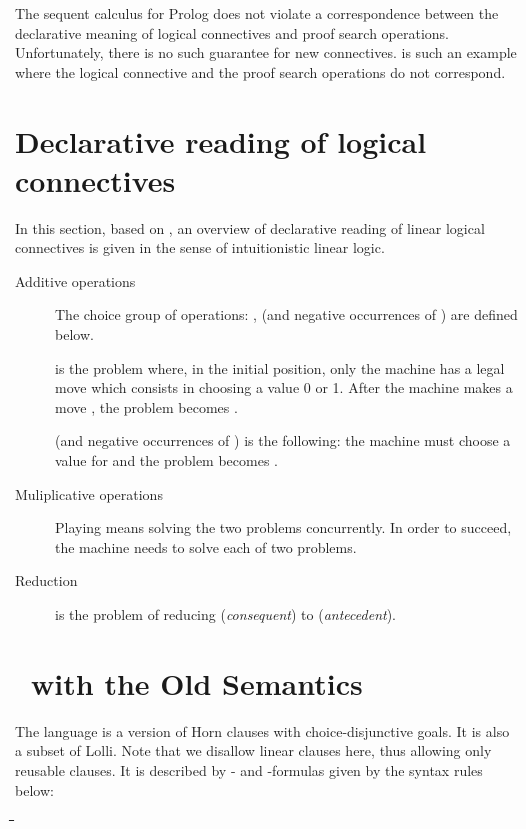 \documentclass[letter]{ieice}
\newenvironment{exmple}{
 \begingroup \begin{tabbing} \hspace{2em}\= \hspace{3em}\= \hspace{3em}\=
\hspace{3em}\= \hspace{3em}\= \hspace{3em}\= \kill}{
 \end{tabbing}\endgroup}
\begin{document}
The sequent
calculus for Prolog  does not violate a correspondence between the declarative
meaning of  logical connectives and proof search operations. Unfortunately, there is no such
guarantee for new connectives.  
  is such an example where the logical connective  and the proof search operations do not  correspond.
 
\section{Declarative reading of logical connectives}\label{s2}

In this section, based on \cite{HM94,Jap03},  an   overview of declarative reading of linear logical connectives is given
in the sense of  intuitionistic linear logic.

\begin{description}


\item[Additive operations]

The choice group of operations:   ,  (and negative occurrences of ) are defined below.

 is the problem where, in the initial position, only the machine has a legal move which consists in 
choosing a value 0 or 1. After the machine makes a move , 
the problem becomes  . 

 (and negative occurrences of ) is the following: the machine must choose a value  for  and the problem becomes . 

\item[Muliplicative operations]

Playing  means solving the two problems concurrently.  In order to succeed,  
the machine needs to solve each of two problems. 

\item[Reduction]

  is the problem of reducing  ({\em consequent}) to  ({\em antecedent}).  

\end{description}

\section{\muprolog\ with the Old Semantics}

The language is a version of Horn clauses
 with choice-disjunctive goals. It is also a subset of Lolli\cite{HM94}.
 Note that  we disallow linear clauses here, thus allowing only
reusable clauses. 
It is described
by - and -formulas given by the syntax rules below:
\begin{exmple}
\> \>    \\   \\
\> \>  \\
\end{exmple}
\noindent
\newcommand{\sync}{up}
\newcommand{\async}{down}
\end{document}
